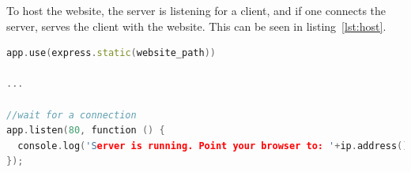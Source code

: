 To host the website, the server is listening for a client, and if one connects the server, serves the client with the website. This can be seen in listing~\ref{lst:host}.

\begin{lstlisting}[caption = {Hosting server}, captionpos=b, label={lst:host}, language=C++,firstnumber=1]
app.use(express.static(website_path))

...

//wait for a connection
app.listen(80, function () {
  console.log('Server is running. Point your browser to: '+ip.address()+':80');
});
\end{lstlisting}

